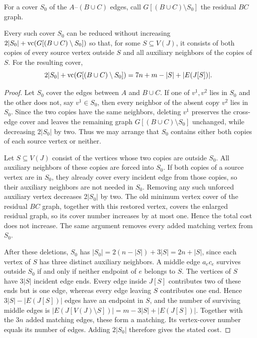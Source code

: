 For a cover $S_0$ of the $A$--$(B\cup C)$ edges, call
$G[(B\cup C)\setminus S_0]$ the residual $BC$ graph.

\begin{lemma}\label{lem:cubic-cover-normalization}
Every such cover $S_0$ can be reduced without increasing
$2|S_0|+\operatorname{vc}(G[(B\cup C)\setminus S_0])$ so that, for some
$S\subseteq V(J)$, it consists of both copies of every source vertex
outside $S$ and all auxiliary neighbors of the copies of $S$.
For the resulting cover,
\begin{equation}\label{eq:cubic-cover-cost}
 2|S_0|+\operatorname{vc}(G[(B\cup C)\setminus S_0])
 =7n+m-|S|+|E(J[S])|.
\end{equation}
\end{lemma}

\begin{proof}
Let $S_0$ cover the edges between $A$
and $B\cup C$. If one of $v^1,v^2$ lies in $S_0$ and the other does not, say
$v^1\in S_0$, then every neighbor of the absent copy $v^2$ lies in
$S_0$. Since the two copies have the same neighbors, deleting $v^1$
preserves the cross-edge cover and leaves the remaining graph
$G[(B\cup C)\setminus S_0]$ unchanged, while decreasing $2|S_0|$
by two. Thus we may arrange that $S_0$ contains either both copies of each
source vertex or neither.

Let $S\subseteq V(J)$ consist of the vertices whose two copies are
outside $S_0$. All auxiliary neighbors of these copies are forced
into $S_0$. If both copies of a source vertex are in $S_0$, they already
cover every incident edge from those copies, so their auxiliary
neighbors are not needed in $S_0$. Removing any such unforced auxiliary
vertex decreases $2|S_0|$ by two.
The old minimum vertex cover of the residual $BC$ graph, together
with this restored vertex, covers the enlarged residual graph, so its
cover number increases by at most one. Hence the total cost does not
increase. The same argument removes every added matching vertex from
$S_0$.

After these deletions, $S_0$ has
$|S_0|=2(n-|S|)+3|S|=2n+|S|$, since each vertex of $S$ has three
distinct auxiliary neighbors.
A middle edge $a_ec_e$ survives outside $S_0$ if and only if neither
endpoint of $e$ belongs to $S$. The vertices of $S$ have $3|S|$
incident edge ends. Every edge inside $J[S]$ contributes two of
these ends but is one edge, whereas every edge leaving $S$ contributes
one end. Hence $3|S|-|E(J[S])|$ edges have an endpoint in $S$,
and the number of surviving middle edges is
$|E(J[V(J)\setminus S])|=m-3|S|+|E(J[S])|$.
Together with the $3n$ added matching edges, these form a matching.
Its vertex-cover number equals its number of edges. Adding $2|S_0|$
therefore gives the stated cost.
\end{proof}

